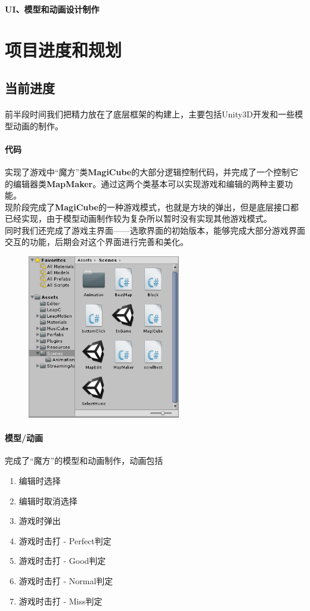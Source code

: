 \documentclass{article}
\begin{document}
\paragraph{UI、模型和动画设计制作}
\section{项目进度和规划}
\subsection{当前进度}
\paragraph{}
前半段时间我们把精力放在了底层框架的构建上，主要包括Unity3D开发和一些模型动画的制作。
\paragraph{代码}
实现了游戏中“魔方”类\textbf{MagiCube}的大部分逻辑控制代码，并完成了一个控制它的编辑器类\textbf{MapMaker}。通过这两个类基本可以实现游戏和编辑的两种主要功能。\\
现阶段完成了\textbf{MagiCube}的一种游戏模式，也就是方块的弹出，但是底层接口都已经实现，由于模型动画制作较为复杂所以暂时没有实现其他游戏模式。\\
同时我们还完成了游戏主界面——选歌界面的初始版本，能够完成大部分游戏界面交互的功能，后期会对这个界面进行完善和美化。
\begin{figure}[H]
  \centering
  \includegraphics[width=18em]{work.png}\\
  \caption{}\label{}
\end{figure}
\paragraph{模型/动画}
完成了“魔方”的模型和动画制作，动画包括
\begin{enumerate}
  \item 编辑时选择
  \item 编辑时取消选择
  \item 游戏时弹出
  \item 游戏时击打 - Perfect判定
  \item 游戏时击打 - Good判定
  \item 游戏时击打 - Normal判定
  \item 游戏时击打 - Miss判定
\end{enumerate}
\end{document}
